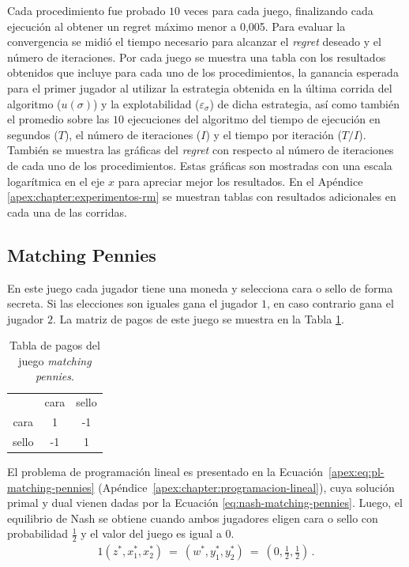 Cada procedimiento fue probado $10$ veces para cada juego, finalizando cada ejecución al obtener un regret máximo menor a 0,005.  Para evaluar la convergencia se midió el tiempo necesario para alcanzar el \textit{regret} deseado y el número de iteraciones. Por cada juego se muestra una tabla con los resultados obtenidos que incluye para cada uno de los procedimientos, la ganancia esperada para el primer jugador al utilizar la estrategia obtenida en la última corrida del algoritmo ($u({\sigma})$) y la explotabilidad ($\varepsilon_{\sigma}$) de dicha estrategia, así como también el promedio sobre las $10$ ejecuciones del algoritmo del tiempo de ejecución en segundos ($T$), el número de iteraciones ($I$) y el tiempo por iteración ($T/I$). También se muestra las gráficas del \textit{regret} con respecto al número de iteraciones de cada uno de los procedimientos. Estas gráficas son mostradas con una escala logarítmica en el eje $x$ para apreciar mejor los resultados. En el Apéndice \ref{apex:chapter:experimentos-rm} se muestran tablas con resultados adicionales en cada una de las corridas.

\subsection*{Matching Pennies}

En este juego cada jugador tiene una moneda y selecciona cara o sello de forma secreta. Si las elecciones son iguales gana el jugador $1$, en caso contrario gana el jugador $2$. La matriz de pagos de este juego se muestra en la Tabla \ref{table:pagos-matching-pennies}.
\begin{table}[h]
\begin{center}
\caption[Tabla de pagos del juego matching pennies]{Tabla de pagos del juego \textit{matching pennies}.}
\label{table:pagos-matching-pennies}
\begin{tabular}{ c | c | c |}
 \multicolumn{1}{c}{} & \multicolumn{1}{c}{cara} & \multicolumn{1}{c}{sello}  \\ \cline{2-3}
 cara  &  1 & -1 \\ \cline{2-3}
 sello & -1 &  1 \\ \cline{2-3}
\end{tabular}
\end{center}
\end{table}

El problema de programación lineal es presentado en la Ecuación~\ref{apex:eq:pl-matching-pennies} (Apéndice~\ref{apex:chapter:programacion-lineal}), cuya solución primal y dual vienen dadas por la Ecuación \ref{eq:nash-matching-pennies}. Luego, el equilibrio de Nash se obtiene cuando ambos jugadores eligen cara o sello con probabilidad $\frac{1}{2}$ y el valor del juego es igual a $0$.
\begin{alignat}{1}
\label{eq:nash-matching-pennies}
(z^*, x_1^*, x_2^*)\ =\ (w^*, y^*_1, y^*_2)\ =\ \left(0, \frac{1}{2}, \frac{1}{2} \right) \,.
\end{alignat}

